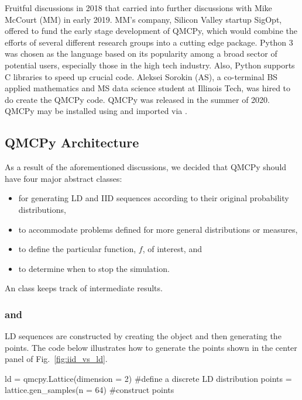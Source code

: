 \documentclass[11pt]{NSFamsart}
\begin{document}
Fruitful discussions in 2018 that carried into further discussions with Mike McCourt (MM) in early 2019.  MM's company, Silicon Valley startup SigOpt, offered to fund the early stage development of  QMCPy, which would combine the efforts of several different research groups into a cutting edge package. Python 3 was chosen as the language based on its popularity among a broad sector of potential users, especially those in the high tech industry.  Also, Python supports C libraries to speed up crucial code.  Aleksei Sorokin (AS),  a co-terminal BS applied mathematics and MS data science student at Illinois Tech, was hired to do create the QMCPy code.  QMCPy was released in the summer of 2020.  QMCPy may be installed using  and imported via .




\subsection{QMCPy Architecture}

As a result of the aforementioned discussions, we decided that QMCPy should have four major abstract classes:
\begin{itemize}
	\item {} for generating LD and IID sequences according to their original probability distributions,
	\item {} to accommodate problems defined for more general distributions or measures,
	\item {} to define the particular function, $f$, of interest, and
	\item {} to determine when to stop the simulation.
\end{itemize}
An  class keeps track of intermediate results.

\subsubsection{\textup{ and }} LD sequences are constructed by creating the object and then generating the points.  The code below illustrates how to generate the points shown in the center panel of Fig.\ \ref{fig:iid_vs_ld}.
\begin{pythoncode}
ld = qmcpy.Lattice(dimension = 2)  #define a discrete LD distribution 
points = lattice.gen_samples(n = 64)  #construct points
\end{pythoncode}
\end{document}

